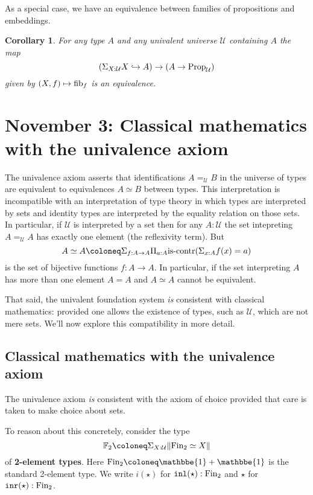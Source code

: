 \documentclass{amsart}
\theoremstyle{theorem}
\newtheorem*{cor}{Corollary}
\theoremstyle{definition}
\theoremstyle{remark}
\newcommand{\0}{\mathbbe{0}}
\newcommand{\1}{\mathbbe{1}}
\newcommand{\2}{\mathbbe{2}}
\newcommand{\3}{\mathbbe{3}}
\newcommand{\4}{\mathbbe{4}}
\newcommand{\FF}{\mathbb{F}}
\newcommand{\term}[1]{{\textup{\texttt{#1}}}}
\newcommand{\type}[1]{{\textup{#1}}}
\newcommand{\inl}{\term{inl}}
\newcommand{\inr}{\term{inr}}
\newcommand{\UU}{{\mathcal{U}}}
\newcommand{\iscontr}{\type{is-contr}}
\newcommand{\fib}{\type{fib}}
\newcommand{\Prop}{\type{Prop}_{\UU}}
\newcommand{\mere}[1]{\|{#1}\|}
\newcommand{\Fin}{\type{Fin}}
\begin{document}
As a special case, we have an equivalence between families of propositions and embeddings.

\begin{cor} For any type $A$ and any univalent universe $\UU$ containing $A$ the map
\[ \left( \Sigma_{X:\UU} X \hookrightarrow A \right) \to (A \to \Prop)\]
given by $(X,f) \mapsto \fib_f$ is an equivalence.
\end{cor}

\section*{November 3: Classical mathematics with the univalence axiom}

The univalence axiom asserts that identifications $A =_{\UU} B$ in the universe of types are equivalent to equivalences $A \simeq B$ between types. This interpretation is incompatible with an interpretation of type theory in which types are interpreted by sets and identity types are interpreted by the equality relation on those sets. In particular, if $\UU$ is interpreted by a set then for any $A : \UU$ the set intepreting $A =_\UU A$ has exactly one element (the reflexivity term). But 
\[ A \simeq A \coloneq \Sigma_{f : A \to A} \Pi_{a :A} \iscontr{\left(\Sigma_{x:A} f(x) = a \right)}\]
is the set of bijective functions $f \colon A \to A$. In particular, if the set interpreting $A$ has more than one element $A = A$ and $A \simeq A$ cannot be equivalent.

That said, the univalent foundation system \emph{is} consistent with classical mathematics: provided one allows the existence of types, such as $\UU$, which are not mere sets. We'll now explore this compatibility in more detail.

\subsection*{Classical mathematics with the univalence axiom}

The univalence axiom \emph{is} consistent with the axiom of choice provided that care is taken to make choice about sets.

To reason about this concretely, consider the type
\[ \FF_2 \coloneq \Sigma_{X: \UU} \mere{ \Fin_2 \simeq X}\]
of \textbf{2-element types}. Here $\Fin_2 \coloneq \1 + \1$ is the standard 2-element type. We write $i(\star)$ for $\inl(\star) : \Fin_2$ and $\star$ for $\inr(\star) : \Fin_2$.
\end{document}
